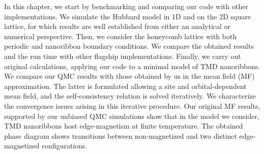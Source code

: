 
\label{cap:applications}

\slshape

In this chapter, we start by benchmarking and comparing our code with other implementations.
We simulate the Hubbard model in \acs{1D} and on the \acs{2D} square lattice, for which results are well established from either an analytical or numerical perspective.
Then, we consider the honeycomb lattice with both periodic and nanoribbon boundary conditions.
We compare the obtained results and the run time with other flagship implementations.
Finally, we carry out original calculations, applying our code to a minimal model of \acs{TMD} nanoribbons.
We compare our \acs{QMC} results with those obtained by us in the mean field (MF)  approximation.
The latter is formulated allowing a site and orbital-dependent mean field, and the self-consistency relation is solved iteratively.
We characterize the convergence issues arising in this iterative procedure.
Our original MF results, supported by our unbiased \acs{QMC} simulations show that in the model we consider, \acs{TMD} nanoribbons host edge-magnetism at finite temperature.
The obtained phase diagram shows  transitions between non-magnetized and two distinct edge-magnetized configurations.

\normalfont




